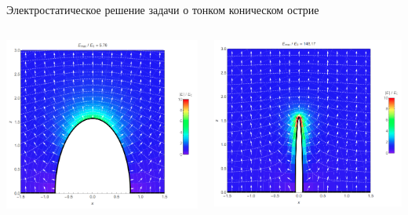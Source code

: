 \documentclass[9pt, compress, xcolor=table]{beamer}
\begin{document}
\begin{frame}{Электростатическое решение задачи о тонком коническом острие}
\begin{columns}[c]
\column{4cm}
\begin{center}
\includegraphics[width=\textwidth]{stat3}
 \end{center}
\column{4cm}
\begin{center}
\includegraphics[width=\textwidth]{stat1}

\end{center}
\end{columns}
\end{frame}
\end{document}
